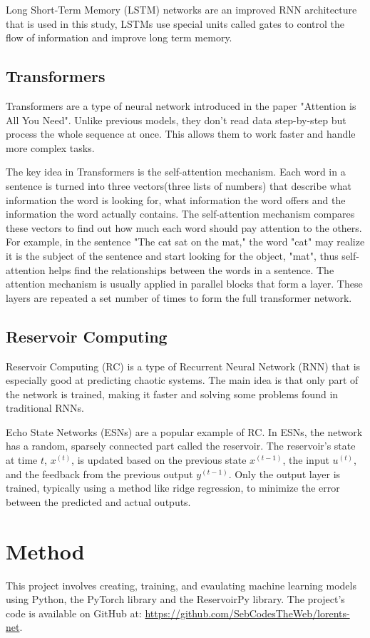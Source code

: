 \documentclass[11pt]{article}
\begin{document}
Long Short-Term Memory (LSTM) networks are an improved RNN architecture that is used in this study,  LSTMs use special units called gates to control the flow of information and improve long term memory.


\subsection{Transformers}
Transformers are a type of neural network introduced in the paper "Attention is All You Need". Unlike previous models, they don't read data step-by-step but process the whole sequence at once. This allows them to work faster and handle more complex tasks.

The key idea in Transformers is the self-attention mechanism. Each word in a sentence is turned into three vectors(three lists of numbers) that describe what information the word is looking for, what information the word offers and the information the word actually contains. The self-attention mechanism compares these vectors to find out how much each word should pay attention to the others. For example, in the sentence "The cat sat on the mat," the word "cat" may realize it is the subject of the sentence and start looking for the object, "mat", thus self-attention helps find the relationships between the words in a sentence. The attention mechanism is usually applied in parallel blocks that form a layer. These layers are repeated a set number of times to form the full transformer network. 

\subsection{Reservoir Computing}
Reservoir Computing (RC) is a type of Recurrent Neural Network (RNN) that is especially good at predicting chaotic systems. The main idea is that only part of the network is trained, making it faster and solving some problems found in traditional RNNs.

Echo State Networks (ESNs) are a popular example of RC. In ESNs, the network has a random, sparsely connected part called the reservoir. The reservoir's state at time $t$, $x^{(t)}$, is updated based on the previous state $x^{(t-1)}$, the input $u^{(t)}$, and the feedback from the previous output $y^{(t-1)}$. Only the output layer is trained, typically using a method like ridge regression, to minimize the error between the predicted and actual outputs.


\section{Method}
This project involves creating, training, and evaulating machine learning models using Python, the PyTorch library and the ReservoirPy library. The project's code is available on GitHub at: \url{https://github.com/SebCodesTheWeb/lorents-net}.
\end{document}
